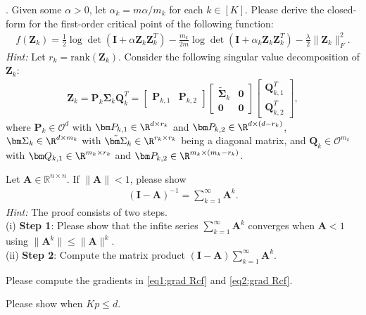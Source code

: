 \documentclass[../../book-main.tex]{subfiles}
\begin{document}
\begin{exercise}
. Given some $\alpha >0$, let $\alpha_k=m\alpha/m_k$ for each $k \in [K]$. Please derive the closed-form for the first-order critical point of the following function: 
\begin{align*}
    f(\bm Z_k) = \frac{1}{2}\log\det\left(\bm I + \alpha\bm Z_k\bm Z_k^T \right) - \frac{m_k}{2m}\log\det\left(\bm I + \alpha_k \bm Z_k\bm Z_k^T \right) - \frac{\lambda}{2}\|\bm Z_k\|_F^2. 
\end{align*}
{\em Hint:} Let $r_k=\mathrm{rank}(\bm Z_k)$. Consider the following singular value decomposition of $\bm Z_k$: 
\begin{align*}
    \bm Z_k = \bm P_k\bm \Sigma_k\bm Q_k^T = \begin{bmatrix}
        \bm P_{k,1} & \bm P_{k,2}
    \end{bmatrix} \begin{bmatrix}
        \tilde{\bm \Sigma}_{k} & \bm 0 \\
        \bm 0 & \bm 0
    \end{bmatrix} 
    \begin{bmatrix}
        \bm Q_{k,1}^T \\ \bm Q_{k,2}^T
    \end{bmatrix}, 
\end{align*}
where $\bm P_k \in \mathcal{O}^d$ with $\bm P_{k,1} \in \R^{d\times r_k}$ and  $\bm P_{k,2} \in \R^{d\times (d-r_k)}$, $\bm \Sigma_k \in \R^{d\times m_k}$ with $\tilde{\bm \Sigma}_{k} \in \R^{r_k\times r_k}$ being a diagonal matrix, and  $\bm Q_k \in \mathcal{O}^{m_k}$ with $\bm Q_{k,1} \in \R^{m_k\times r_k}$ and  $\bm P_{k,2} \in \R^{m_k \times (m_k-r_k)}$. 
\medskip 

\end{exercise}


\begin{exercise}\label{ex:neumannn} 
Let $\bm A \in \mathbb{R}^{n\times n}$. If $\|\bm A\| < 1$, please show 
\begin{align}\label{eq:neumann}
    \left( \bm I - \bm A\right)^{-1} = \sum_{k=1}^\infty \bm A^k.  
\end{align}
{\em Hint:} The proof consists of two steps. \\
(i) {\bf Step 1}: Please show that the infite series $\sum_{k=1}^\infty \bm A^k$ converges when $\bm A < 1$ using $\|\bm A^k\| \le \|\bm A\|^k$. \\
(ii) {\bf Step 2}: Compute the matrix product $(\bm I - \bm A) \sum_{k=1}^\infty \bm A^k$. 
\end{exercise}


\begin{exercise}
    Please compute the gradients in \eqref{eq1:grad Rcf} and \eqref{eq2:grad Rcf}. 
\end{exercise}


\begin{exercise}
    Please show  when $Kp \le d$. 
\end{exercise}
\end{document}

